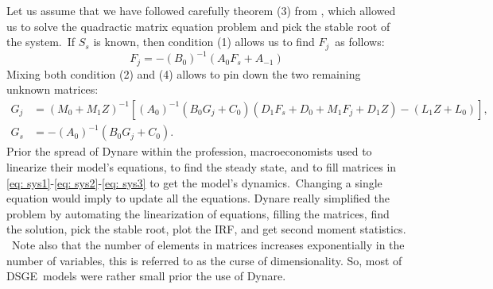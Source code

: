\documentclass[a4paper,12pt]{article}%
\begin{document}
Let us assume that we have followed carefully theorem (3) from
\cite{uhlig1995toolkit}, which allowed us to solve the quadractic matrix
equation problem and pick the stable root of the system.\ If $S_{s}$ is known,
then condition (1) allows us to find $F_{j}$\ as follows:
\begin{equation}
F_{j}=-\left(  B_{0}\right)  ^{-1}\left(  A_{0}F_{s}+A_{-1}\right)
\end{equation}
Mixing both condition (2) and (4) allows to pin down the two remaining unknown
matrices:%
\begin{align}
G_{j}  &  =\left(  M_{0}+M_{1}Z\right)  ^{-1}\left[  \left(  A_{0}\right)
^{-1}\left(  B_{0}G_{j}+C_{0}\right)  \left(  D_{1}F_{s}+D_{0}+M_{1}%
F_{j}+D_{1}Z\right)  -\left(  L_{1}Z+L_{0}\right)  \right]  ,\\
G_{s}  &  =-\left(  A_{0}\right)  ^{-1}\left(  B_{0}G_{j}+C_{0}\right)  .
\end{align}
Prior the spread of Dynare within the profession, macroeconomists used to
linearize their model's equations, to find the steady state, and to fill
matrices in \autoref{eq: sys1}-\ref{eq: sys2}-\ref{eq: sys3} to get the
model's dynamics.\ Changing a single equation would imply to update all the
equations. Dynare really simplified the problem by automating the
linearization of equations, filling the matrices, find the solution, pick the
stable root, plot the IRF, and get second moment statistics. \ Note also that
the number of elements in matrices increases exponentially in the number of
variables, this is referred to as \textsf{the curse of dimensionality}. So,
most of DSGE\ models were rather small prior the use of Dynare.
\end{document}
